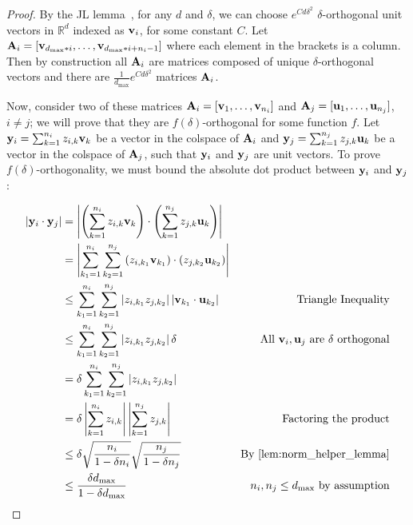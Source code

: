 \documentclass{article} %
\theoremstyle{plain}
\theoremstyle{definition}
\begin{document}
\packingalmostorthogonal*
\begin{proof}
By the JL lemma~\citep{Johnson1984, bill_johnson_mathoverflow}, for any $d$ and $\delta$, we can choose $e^{C d \delta^2}$ $\delta$-orthogonal unit vectors in $\mathbb{R}^d$ indexed as $\mathbf{v}_{i}$, for some constant $C$. Let ${\mathbf A}_i = [\mathbf{v}_{d_{\max} * i}, \ldots, \mathbf{v}_{d_{\max} * i + n_i - 1}]$ where each element in the brackets is a column. Then by construction all ${\mathbf A}_i$ are matrices composed of unique $\delta$-orthogonal vectors and there are $\frac{1}{d_{\max}}e^{C d \delta^2}$ matrices ${\mathbf A}_i$.

Now, consider two of these matrices ${\mathbf A}_i = [\mathbf{v}_{1}, \ldots, \mathbf{v}_{n_i}]$ and ${\mathbf A}_j = [\mathbf{u}_1, \ldots, \mathbf{u}_{n_j}]$, $i \ne j$; we will prove that they are $f(\delta)$-orthogonal for some function $f$. Let $\mathbf{y}_i = \sum_{k = 1}^{n_i} z_{i, k} \mathbf{v}_{k} $ be a vector in the colspace of ${\mathbf A}_i$ and $\mathbf{y}_j= \sum_{k = 1}^{n_j} z_{j, k} \mathbf{u}_k$ be a vector in the colspace of ${\mathbf A}_j$, such that $\mathbf{y}_i$ and $\mathbf{y}_j$ are unit vectors. To prove $f(\delta)$-orthogonality, we must bound the absolute dot product between $\mathbf{y}_i$ and $\mathbf{y}_j$: 

\begin{align*}
    \left| \y_i \cdot \y_j \right| &= \left| \left( \sum_{k = 1}^{n_i} z_{i, k} \vv{k} \right) \cdot \left( \sum_{k = 1}^{n_j} z_{j, k} \uu_k \right) \right| \\
    &= \left| \sum_{k_1=1}^{n_i} \sum_{k_2=1}^{n_j} \left( z_{i, k_1} \vv{k_1} \right) \cdot \left( z_{j, k_2} \uu_{k_2} \right) \right| \\
    &\le \sum_{k_1=1}^{n_i} \sum_{k_2=1}^{n_j} \left| z_{i, k_1} z_{j, k_2} \right| \left| \vv{k_1} \cdot \uu_{k_2} \right| &\text{Triangle Inequality} \\
    &\le \sum_{k_1=1}^{n_i} \sum_{k_2=1}^{n_j} \left| z_{i, k_1} z_{j, k_2} \right| \delta &\text{All $\vv{i}, \uu_j$ are $\delta$ orthogonal} \\
    &= \delta \sum_{k_1=1}^{n_i} \sum_{k_2=1}^{n_j} \left| z_{i, k_1} z_{j, k_2} \right| \\
    &= \delta \left| \sum_{k=1}^{n_i} z_{i, k} \right| \left| \sum_{k=1}^{n_j} z_{j, k} \right| &\text{Factoring the product} \\
    &\le \delta \sqrt{\frac{n_i}{1 - \delta n_i}} \sqrt{\frac{n_j}{1 - \delta n_j}} &\text{By \cref{lem:norm_helper_lemma}} \\
    &\le \frac{\delta d_{\max}}{1 - \delta d_{\max}} &\text{$n_i, n_j \le d_{\max}$ by assumption}
\end{align*}


\end{proof}
\end{document}
